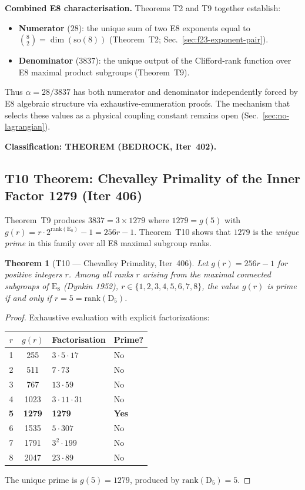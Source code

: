 \documentclass[aps,prd,twocolumn,superscriptaddress,floatfix,nofootinbib]{revtex4-2}
\newtheorem{theorem}{Theorem}
\theoremstyle{definition}
\theoremstyle{remark}
\begin{document}
\textbf{Combined E8 characterisation.}  Theorems T2 and T9 together establish:
\begin{itemize}
  \item \textbf{Numerator} ($28$): the unique sum of two E8 exponents equal to
        $\binom{8}{2} = \dim(\mathrm{so}(8))$ (Theorem~T2; Sec.~\ref{sec:f23-exponent-pair}).
  \item \textbf{Denominator} ($3837$): the unique output of the Clifford-rank function
        over E8 maximal product subgroups (Theorem~T9).
\end{itemize}
Thus $\alpha = 28/3837$ has both numerator and denominator independently forced by E8
algebraic structure via exhaustive-enumeration proofs.  The mechanism that selects these
values as a physical coupling constant remains open (Sec.~\ref{sec:no-lagrangian}).

\textbf{Classification: THEOREM (BEDROCK, Iter~402).}

\subsection{T10 Theorem: Chevalley Primality of the Inner Factor 1279 (Iter 406)}
\label{sec:chevalley-primality}

Theorem~T9 produces $3837 = 3 \times 1279$ where $1279 = g(5)$ with
$g(r) = r \cdot 2^{\mathrm{rank}(\mathrm{E}_8)} - 1 = 256r - 1$.
Theorem~T10 shows that $1279$ is the \emph{unique prime} in this family over
all E8 maximal subgroup ranks.

\begin{theorem}[T10 --- Chevalley Primality, Iter~406]
Let $g(r) = 256r - 1$ for positive integers $r$.  Among all ranks $r$
arising from the maximal connected subgroups of $\mathrm{E}_8$ (Dynkin
1952), $r \in \{1,2,3,4,5,6,7,8\}$, the value $g(r)$ is prime if and only
if $r = 5 = \mathrm{rank}(\mathrm{D}_5)$.
\end{theorem}
\begin{proof}
Exhaustive evaluation with explicit factorizations:
\begin{center}
\begin{tabular}{ccll}
\toprule
$r$ & $g(r)$ & Factorisation & Prime? \\
\midrule
1 & 255   & $3\cdot5\cdot17$    & No \\
2 & 511   & $7\cdot73$          & No \\
3 & 767   & $13\cdot59$         & No \\
4 & 1023  & $3\cdot11\cdot31$   & No \\
\textbf{5} & \textbf{1279} & \textbf{1279} & \textbf{Yes} \\
6 & 1535  & $5\cdot307$         & No \\
7 & 1791  & $3^2\cdot199$       & No \\
8 & 2047  & $23\cdot89$         & No \\
\bottomrule
\end{tabular}
\end{center}
The unique prime is $g(5) = 1279$, produced by $\mathrm{rank}(\mathrm{D}_5) = 5$.
\end{proof}
\end{document}
